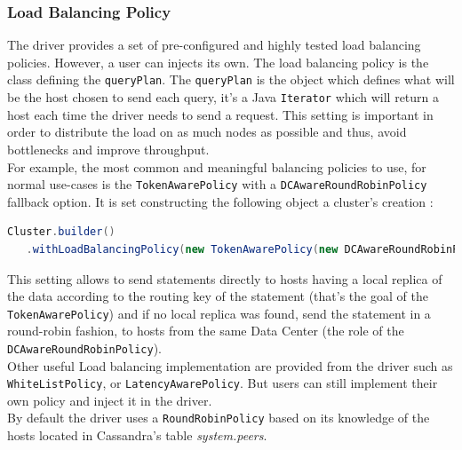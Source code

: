 \documentclass[a4paper]{report}
\begin{document}
\subsubsection{Load Balancing Policy}
The driver provides a set of pre-configured and highly tested load balancing policies. However, a user can injects its own. The load balancing policy is the class defining the \verb;queryPlan;. The \verb;queryPlan; is the object which defines what will be the host chosen to send each query, it's a Java \verb;Iterator; which will return a host each time the driver needs to send a request. This setting is important in order to distribute the load on as much nodes as possible and thus, avoid bottlenecks and improve throughput.\\
For example, the most common and meaningful balancing policies to use, for normal use-cases is the \verb;TokenAwarePolicy; with a \verb;DCAwareRoundRobinPolicy; fallback option. 
It is set constructing the following object a cluster's creation :
\begin{lstlisting}[label=lbp-ex-1, caption=Creation of the cluster, language=Java]
Cluster.builder()
   .withLoadBalancingPolicy(new TokenAwarePolicy(new DCAwareRoundRobinPolicy, true));
\end{lstlisting}
This setting allows to send statements directly to hosts having a local replica of the data according to the routing key of the statement (that's the goal of the \verb;TokenAwarePolicy;) and if no local replica was found, send the statement in a round-robin fashion, to hosts from the same Data Center (the role of the \verb;DCAwareRoundRobinPolicy;).\\
Other useful Load balancing implementation are provided from the driver such as \verb;WhiteListPolicy;, or \verb;LatencyAwarePolicy;. But users can still implement their own policy and inject it in the driver. \\
By default the driver uses a \verb;RoundRobinPolicy; based on its knowledge of the hosts located in Cassandra's table \emph{system.peers}.
\end{document}
